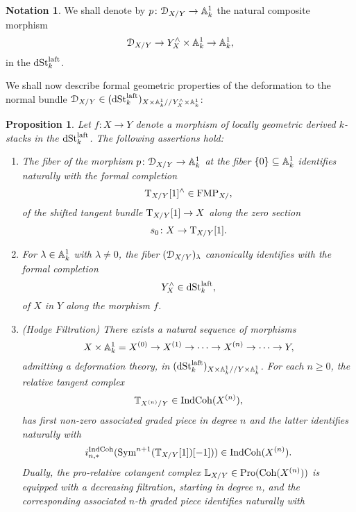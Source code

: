 \documentclass[10pt,a4paper,reqno]{amsart} %
\theoremstyle{plain}
\newtheorem{prop}[thm]{Proposition}
\theoremstyle{definition}
\newtheorem{notation}[thm]{Notation}
\theoremstyle{remark}
\numberwithin{equation}{section}
\begin{document}
\begin{notation}
    We shall denote by $p \colon \mathcal D_{X/ Y} \to \mathbb A^1_k$ the natural composite morphism 
        \[
            \mathcal D_{X/ Y} \to Y^\wedge_X \times \mathbb A^1_k \to \mathbb A^1_k,  
        \]
    in the \infcat $\mathrm{dSt}_k^{\mathrm{laft}}$.
\end{notation}



We shall now describe formal geometric properties of the deformation to the normal bundle $\mathcal D_{X/Y} \in (\mathrm{dSt}^{\mathrm{laft}}_k)_{X \times \mathbb A^1_k/ /Y^\wedge_X \times \mathbb A^1_k}$:

\begin{prop} \label{prop:algebraic_properties_of_deformation} Let $f \colon X \to Y$ denote a morphism of locally geometric derived $k$-stacks in the \infcat $\mathrm{dSt}_k^{\mathrm{laft}}$.
    The following assertions hold:
    \begin{enumerate}
        \item The fiber of the morphism $p \colon \mathcal D_{X/Y} \to \mathbb A^1_k$ at the fiber $\{0 \} \subseteq \mathbb A^1_k$ identifies naturally with
        the formal completion 
            \[\mathrm T_{X/Y}[1]^\wedge \in \mathrm{FMP}_{X/ },\]
        of the shifted tangent bundle $\mathrm T_{X/Y}[1] \to X$ along the
        zero section
            \[
                s_0 \colon X \to \mathrm T_{X/Y}[1].  
            \]
        \item For $\lambda \in \mathbb A^1_k$ with $\lambda \neq 0$, the fiber $(\mathcal D_{X/Y})_{\lambda}$ canonically identifies with the formal completion
            \[
                Y^\wedge_X \in \mathrm{dSt}^{\mathrm{laft}}_k,  
            \]
        of $X$ in $Y$ along the morphism $f$.
        \item (Hodge Filtration) There exists a natural sequence of morphisms
            \[
                X \times \mathbb A^1_k = X^{(0)} \to X^{(1)}  \to  \dots \to X^{(n)} \to \dots \to Y,
            \]
        admitting a deformation theory, in $(\mathrm{dSt}_k^{\mathrm{laft}})_{X\times\mathbb A^1_k/ /Y\times\mathbb A^1_k}$. For each $n \ge 0$,
        the relative tangent complex
            \[
                \mathbb T_{X^{(n)} / Y }   \in \mathrm{Ind}\mathrm{Coh}(X^{(n)}),
            \]
        has first non-zero associated graded piece in degree $n$ and the latter identifies naturally with
            \[
                i_{n, *}^{\mathrm{Ind}\mathrm{Coh}} ( \operatorname{Sym}^{n+1} (\mathbb T_{X/ Y} [1])[-1])) \in \mathrm{Ind}\mathrm{Coh}(X^{(n)}).
            \]
        Dually, the pro-relative cotangent complex $\mathbb L_{X/ Y} \in \mathrm{Pro}(\mathrm{Coh}(X^{(n)}))$ is equipped with a decreasing filtration, starting in degree $n$,
        and the corresponding associated $n$-th graded piece identifies naturally with

\end{enumerate}
\end{prop}
\end{document}
